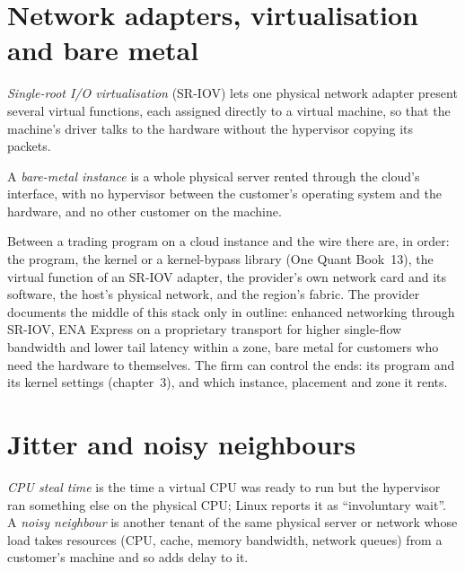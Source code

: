 \section{Network adapters, virtualisation and bare metal}

\begin{definition}\label{def:nw:trading-in-a-public-cloud:sriov}
\emph{Single-root I/O virtualisation} (SR-IOV) lets one physical network adapter present several virtual
functions, each assigned directly to a virtual machine, so that the machine's driver talks to the hardware without the hypervisor copying its
packets.
\end{definition}

\begin{definition}\label{def:nw:trading-in-a-public-cloud:bare}
A \emph{bare-metal instance} is a whole physical server rented through the cloud's interface, with no hypervisor between the
customer's operating system and the hardware, and no other customer on the machine.
\end{definition}

Between a trading program on a cloud instance and the wire there are, in order: the program, the kernel or a kernel-bypass library (One Quant
Book~13), the virtual function of an SR-IOV adapter, the provider's own network card and its software, the host's physical network, and the
region's fabric. The provider documents the middle of this stack only in outline: enhanced networking through SR-IOV, ENA Express on a proprietary
transport for higher single-flow bandwidth and lower tail latency within a zone, bare metal for customers who need the hardware to themselves.
The firm can control the ends: its program and its kernel settings (chapter~3), and which instance, placement and zone it rents.

\section{Jitter and noisy neighbours}

\begin{definition}\label{def:nw:trading-in-a-public-cloud:steal}
\emph{CPU steal time} is the time a virtual CPU was ready to run but the hypervisor ran something else on the physical CPU; Linux
reports it as ``involuntary wait''. A \emph{noisy neighbour} is another tenant of the same physical server or network whose load
takes resources (CPU, cache, memory bandwidth, network queues) from a customer's machine and so adds delay to it.
\end{definition}


